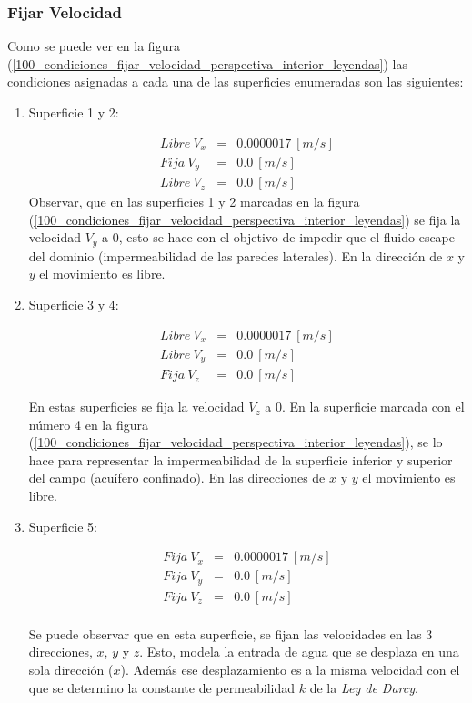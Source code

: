 \documentclass[10pt,a4paper,final]{article}
\begin{document}
\subsubsection*{Fijar Velocidad}
Como se puede ver en la figura (\ref{100_condiciones_fijar_velocidad_perspectiva_interior_leyendas}) las condiciones asignadas a cada una de las superficies enumeradas son las siguientes:

\begin{enumerate}

\item Superficie 1 y 2:

\begin{eqnarray*}
Libre~V_x&=&0.0000017~[m/s]\\
Fija~V_y&=&0.0~[m/s]\\
Libre~V_z&=&0.0~[m/s]
\end{eqnarray*}
Observar, que en las superficies 1 y 2 marcadas en la figura (\ref{100_condiciones_fijar_velocidad_perspectiva_interior_leyendas}) se fija la velocidad $V_y$ a $0$, esto se hace con el objetivo de impedir que el fluido escape del dominio (impermeabilidad de las paredes laterales). En la dirección de $x$ y $y$ el movimiento es libre.

\item Superficie 3 y 4:

\begin{eqnarray*}
Libre~V_x&=&0.0000017~[m/s]\\
Libre~V_y&=&0.0~[m/s]\\
Fija~V_z&=&0.0~[m/s]
\end{eqnarray*}

En estas superficies se fija la velocidad $V_z$ a $0$. En la superficie marcada con el número 4 en la figura (\ref{100_condiciones_fijar_velocidad_perspectiva_interior_leyendas}), se lo hace para representar la impermeabilidad de la superficie inferior y superior del campo (acuífero confinado). En las direcciones de $x$ y $y$ el movimiento es libre.

\item Superficie 5:

\begin{eqnarray*}
Fija~V_x&=&0.0000017~[m/s]\\
Fija~V_y&=&0.0~[m/s]\\
Fija~V_z&=&0.0~[m/s]\\
\end{eqnarray*}

Se puede observar que en esta superficie, se fijan las velocidades en las 3 direcciones, $x$, $y$ y $z$. Esto, modela la entrada de agua que se desplaza en una sola dirección ($x$). Además ese desplazamiento es a la misma velocidad con el que se determino la constante de permeabilidad $k$ de la \emph{Ley de Darcy}.
\end{enumerate}
\end{document}
